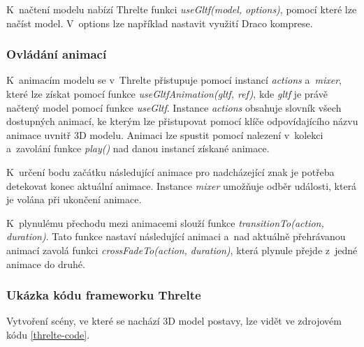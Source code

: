 \documentclass[
  master,
  program=ainfvs,
  biblatex,
  figures=true,
  tables=false,
  sourcecodes=true,
  glossaries,
  index
]{kidiplom}
\begin{document}
            K~načtení modelu nabízí Threlte funkci \emph{useGltf(model, options)}, pomocí které lze načíst model. V~options lze například nastavit využití Draco komprese.


        \subsubsection{Ovládání animací} \label{ovladani-animaci}
            K~animacím modelu se v~Threlte přistupuje pomocí instancí \emph{actions} a~\emph{mixer}, které lze získat pomocí funkce \emph{useGltfAnimation(gltf, ref)}, kde \emph{gltf} je právě načtený model pomocí funkce \emph{useGltf}. Instance \emph{actions} obsahuje slovník všech dostupných animací, ke kterým lze přistupovat pomocí klíče odpovídajícího názvu animace uvnitř 3D modelu. Animaci lze spustit pomocí nalezení v~kolekci a~zavolání funkce \emph{play()} nad danou instancí získané animace.

            K~určení bodu začátku následující animace pro nadcházející znak je potřeba detekovat konec aktuální animace. Instance \emph{mixer} umožňuje odběr události, která je volána při ukončení animace.

            K~plynulému přechodu mezi animacemi slouží funkce \emph{transitionTo(action, duration)}. Tato funkce nastaví následující animaci a~nad aktuálně přehrávanou animací zavolá funkci \emph{crossFadeTo(action, duration)}, která plynule přejde z~jedné animace do druhé.


        \subsubsection{Ukázka kódu frameworku Threlte}
            Vytvoření scény, ve které se nachází 3D model postavy, lze vidět ve zdrojovém kódu \ref{threlte-code}.

\end{document}
